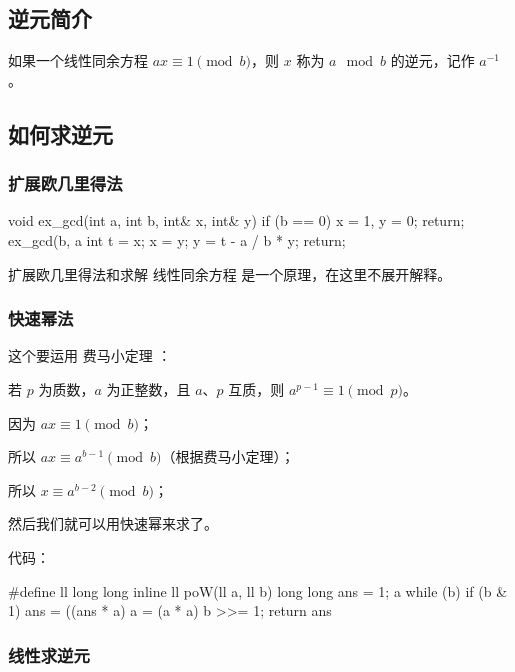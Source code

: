 
\subsection{逆元简介}

如果一个线性同余方程 $ax \equiv 1 \pmod b$，则 $x$ 称为 $a \mod b$ 的逆元，记作 $a^{-1}$。

\subsection{如何求逆元}

\subsubsection{扩展欧几里得法}

\begin{cppcode}
void ex_gcd(int a, int b, int& x, int& y) {
  if (b == 0) {
    x = 1, y = 0;
    return;
  }
  ex_gcd(b, a %
  int t = x;
  x = y;
  y = t - a / b * y;
  return;
}
\end{cppcode}

扩展欧几里得法和求解  线性同余方程  是一个原理，在这里不展开解释。

\subsubsection{快速幂法}

这个要运用  费马小定理 ：

\begin{QUOTE}{}{}
若 $p$ 为质数，$a$ 为正整数，且 $a$、$p$ 互质，则 $a^{p-1} \equiv 1 \pmod p$。
\end{QUOTE}

因为 $ax \equiv 1 \pmod b$；

所以 $ax \equiv a^{b-1} \pmod b$（根据费马小定理）；

所以 $x \equiv a^{b-2} \pmod b$；

然后我们就可以用快速幂来求了。

代码：

\begin{cppcode}
#define ll long long
inline ll poW(ll a, ll b) {
  long long ans = 1;
  a %
  while (b) {
    if (b & 1) ans = ((ans * a) %
    a = (a * a) %
    b >>= 1;
  }
  return ans %
}
\end{cppcode}

\subsubsection{线性求逆元}


